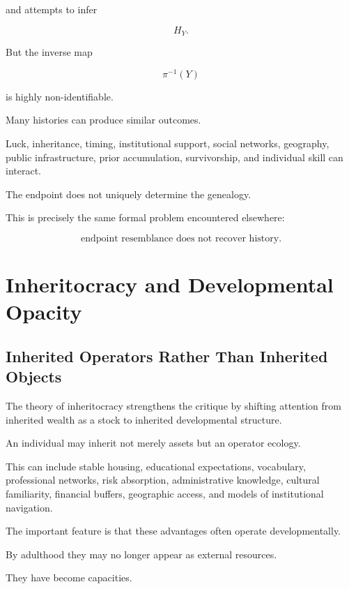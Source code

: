 \documentclass[11pt]{article}
\theoremstyle{remark}
\begin{document}
and attempts to infer

\begin{equation}
H_Y.
\end{equation}

But the inverse map

\begin{equation}
\pi^{-1}(Y)
\end{equation}

is highly non-identifiable.

Many histories can produce similar outcomes.

Luck, inheritance, timing, institutional support, social networks, geography, public infrastructure, prior accumulation, survivorship, and individual skill can interact.

The endpoint does not uniquely determine the genealogy.

This is precisely the same formal problem encountered elsewhere:

\begin{equation}
\boxed{
\text{endpoint resemblance does not recover history}.
}
\end{equation}

\section{Inheritocracy and Developmental Opacity}

\subsection{Inherited Operators Rather Than Inherited Objects}

The theory of inheritocracy strengthens the critique by shifting attention from inherited wealth as a stock to inherited developmental structure.

An individual may inherit not merely assets but an operator ecology.

This can include stable housing, educational expectations, vocabulary, professional networks, risk absorption, administrative knowledge, cultural familiarity, financial buffers, geographic access, and models of institutional navigation.

The important feature is that these advantages often operate developmentally.

By adulthood they may no longer appear as external resources.

They have become capacities.
\end{document}
